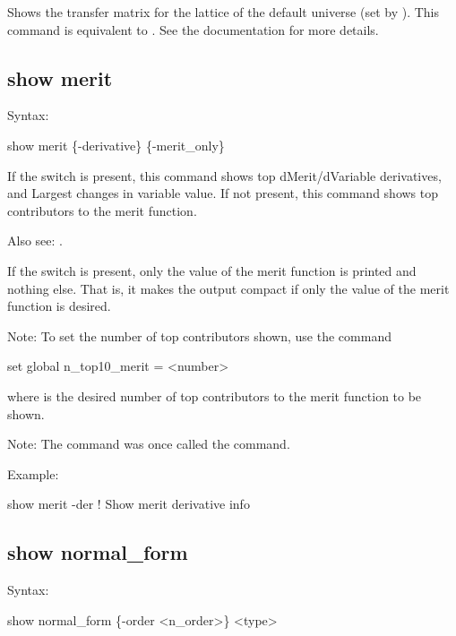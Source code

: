 {{{{{{{{Shows the transfer matrix for the  lattice of the default universe (set by
).  This command is equivalent to . See the  documentation for more details.


\subsection{show merit}
\label{s:show.merit}

Syntax:
\begin{example}
  show merit \{-derivative\} \{-merit_only\}
\end{example}

If the  switch is present, this command shows top dMerit/dVariable
derivatives, and Largest changes in variable value. If not present, this command shows
top contributors to the merit function.

Also see: .

If the  switch is present, only the value of the merit function is printed
and nothing else. That is, it makes the output compact if only the value of the merit function
is desired.

Note: To set the number of top contributors shown, use the command 
\begin{example}
  set global n_top10_merit = <number>
\end{example}
where  is the desired number of top contributors to the merit function to be shown.

Note: The  command was once called the  command.

Example:
\begin{example}
  show merit -der     ! Show merit derivative info
\end{example}


\subsection{show normal_form}
\label{s:show.normal}

Syntax:
\begin{example}
  show normal_form \{-order <n_order>\} <type>
\end{example}


}}}}}}}}
